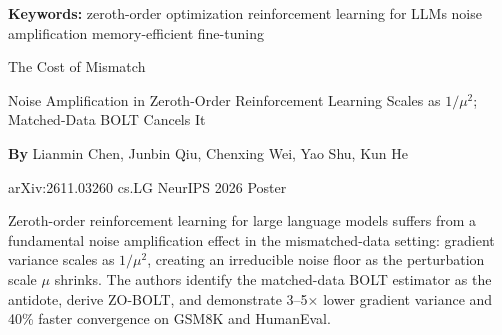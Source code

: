 \documentclass[10pt,twocolumn]{article}
\begin{document}
\setlength{\parindent}{0pt}
\setlength{\parskip}{4pt}

{\small\color{keywordgray}\textbf{Keywords:}
  zeroth-order optimization \textbullet{}
  reinforcement learning for LLMs \textbullet{}
  noise amplification \textbullet{}
  memory-efficient fine-tuning}\par\vspace{4pt}

{\LARGE\bfseries\raggedright
  The Cost of Mismatch}\par\vspace{4pt}

{\large\itshape\raggedright
  Noise Amplification in Zeroth-Order Reinforcement Learning
  Scales as $1/\mu^2$; Matched-Data BOLT Cancels It}\par\vspace{6pt}

{\small\textbf{By} Lianmin Chen, Junbin Qiu, Chenxing Wei, Yao Shu,
  Kun He}\par\vspace{2pt}

{\small\color{keywordgray}arXiv:2611.03260 \textbullet{}
  cs.LG \textbullet{} NeurIPS 2026 Poster}
\par\vspace{2pt}\noindent{\color{rulered}\rule{\columnwidth}{0.6pt}}\vspace{6pt}

Zeroth-order reinforcement learning for large language models suffers
from a fundamental noise amplification effect in the mismatched-data
setting: gradient variance scales as $1/\mu^2$, creating an irreducible
noise floor as the perturbation scale $\mu$ shrinks. The authors identify
the matched-data BOLT estimator as the antidote, derive ZO-BOLT, and
demonstrate 3--5$\times$ lower gradient variance and 40\% faster
convergence on GSM8K and HumanEval.
\end{document}
